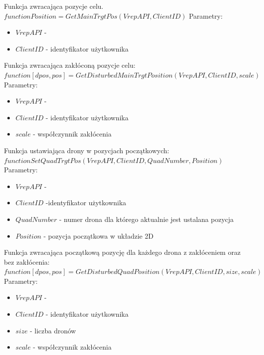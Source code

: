 \documentclass[a4paper, 11pt, oneside]{article}
\begin{document}
Funkcja zwracająca pozycje celu.
\newline
$function Position = GetMainTrgtPos(VrepAPI, ClientID)$
\newline
Parametry:
\begin{itemize}
\item $VrepAPI$ - 
\item $ClientID$ - identyfikator użytkownika
\end{itemize}

Funkcja zwracająca zakłóconą pozycje celu: 
\newline
$function [dpos, pos]=GetDisturbedMainTrgtPosition(VrepAPI, ClientID, scale)$
\newline
Parametry:
\begin{itemize}
\item $VrepAPI$ - 
\item $ClientID$ - identyfikator użytkownika
\item $scale$ - współczynnik zakłócenia
\end{itemize}

Funkcja ustawiająca drony w pozycjach początkowych:
\newline
$function SetQuadTrgtPos(VrepAPI, ClientID, QuadNumber, Position)$
\newline
Parametry:
\begin{itemize}
\item $VrepAPI$ - 
\item $ClientID$ -identyfikator użytkownika
\item $QuadNumber$ - numer drona dla którego aktualnie jest ustalana pozycja 
\item $Position$ - pozycja początkowa w układzie 2D
\end{itemize}
Funkcja zwracająca początkową pozycję dla każdego drona z zakłóceniem oraz bez zakłócenia:
\newline
$function [dpos, pos]=GetDisturbedQuadPosition(VrepAPI, ClientID, size, scale)$
\newline
Parametry:
\begin{itemize}
\item $VrepAPI$ - 
\item $ClientID$ - identyfikator użytkownika
\item $size$ - liczba dronów 
\item $scale$ - współczynnik zakłócenia
\end{itemize}
\end{document}
